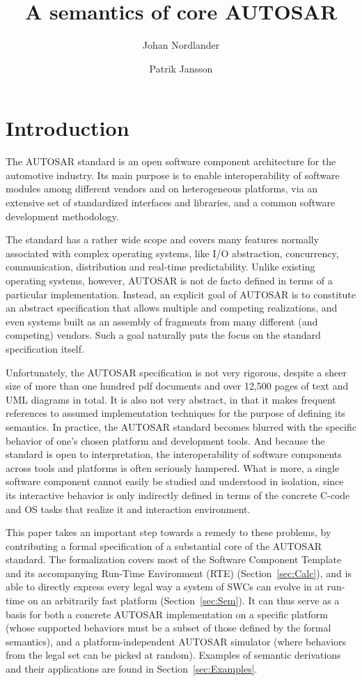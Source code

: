 \documentclass[twocolumn]{article}
\title{A semantics of core AUTOSAR}
\author{Johan Nordlander \and Patrik Jansson}
\begin{document}
\maketitle
\begin{abstract}

\end{abstract}

\section{Introduction}
\label{sec:Intro}

The AUTOSAR standard is an open software component architecture for the automotive industry. Its main purpose is to enable interoperability of software modules among different vendors and on heterogeneous platforms, via an extensive set of standardized interfaces and libraries, and a common software development methodology.

The standard has a rather wide scope and covers many features normally associated with complex operating systems, like I/O abstraction, concurrency, communication, distribution and real-time predictability. Unlike existing operating systems, however, AUTOSAR is not de facto defined in terms of a particular implementation. Instead, an explicit goal of AUTOSAR is to constitute an abstract specification that allows multiple and competing realizations, and even systems built as an assembly of fragments from many different (and competing) vendors. Such a goal naturally puts the focus on the standard specification itself.

Unfortunately, the AUTOSAR specification is not very rigorous, despite a sheer size of more than one hundred pdf documents and over 12,500 pages of text and UML diagrams in total. It is also not very abstract, in that it makes frequent references to assumed implementation techniques for the purpose of defining its semantics. In practice, the AUTOSAR standard becomes blurred with the specific behavior of one's chosen platform and development tools. And because the standard is open to interpretation, the interoperability of software components across tools and platforms is often seriously hampered. What is more, a single software component cannot easily be studied and understood in isolation, since its interactive behavior is only indirectly defined in terms of the concrete C-code and OS tasks that realize it and interaction environment.

This paper takes an important step towards a remedy to these problems, by contributing a formal specification of a substantial core of the AUTOSAR standard. The formalization covers most of the Software Component Template and its accompanying Run-Time Environment (RTE) (Section~\ref{sec:Calc}), and is able to directly express every legal way a system of SWCs can evolve in at run-time on an arbitrarily fast platform (Section~\ref{sec:Sem}). It can thus serve as a basis for both a concrete AUTOSAR implementation on a specific platform (whose supported behaviors must be a subset of those defined by the formal semantics), and a platform-independent AUTOSAR simulator (where behaviors from the legal set can be picked at random). Examples of semantic derivations and their applications are found in Section~\ref{sec:Examples}.
\end{document}
